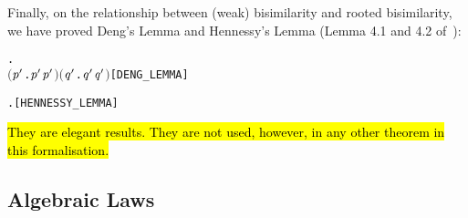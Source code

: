 Finally, on the relationship between (weak) bisimilarity and rooted bisimilarity, 
we have proved Deng's Lemma and Hennessy's Lemma
(Lemma 4.1 and 4.2 of~\citep[p.~176,~178]{Gorrieri:2015jt}):
\begin{alltt}
\HOLTokenTurnstile{} \HOLSymConst{\HOLTokenForall{}} .
        \HOLSymConst{\HOLTokenWeakEQ}  \HOLSymConst{\HOLTokenImp{}}
       \ensuremath{(}\HOLSymConst{\HOLTokenExists{}}\ensuremath{\HOLBoundVar{p}\sp{\prime}}.  \HOLTokenTransBegin\HOLSymConst{\ensuremath{\tau}}\HOLTokenTransEnd \ensuremath{\HOLBoundVar{p}\sp{\prime}} \HOLSymConst{\HOLTokenConj{}} \ensuremath{\HOLBoundVar{p}\sp{\prime}} \HOLSymConst{\HOLTokenWeakEQ} \ensuremath{)} \HOLSymConst{\HOLTokenDisj{}} \ensuremath{(}\HOLSymConst{\HOLTokenExists{}}\ensuremath{\HOLBoundVar{q}\sp{\prime}}.  \HOLTokenTransBegin\HOLSymConst{\ensuremath{\tau}}\HOLTokenTransEnd \ensuremath{\HOLBoundVar{q}\sp{\prime}} \HOLSymConst{\HOLTokenConj{}}  \HOLSymConst{\HOLTokenWeakEQ} \ensuremath{\HOLBoundVar{q}\sp{\prime}}\ensuremath{)} \HOLSymConst{\HOLTokenDisj{}}  \HOLSymConst{\HOLTokenObsCongr} \hfill{[DENG_LEMMA]}
  
\HOLTokenTurnstile{} \HOLSymConst{\HOLTokenForall{}} .  \HOLSymConst{\HOLTokenWeakEQ}  \HOLSymConst{\HOLTokenEquiv{}}  \HOLSymConst{\HOLTokenObsCongr}  \HOLSymConst{\HOLTokenDisj{}}  \HOLSymConst{\HOLTokenObsCongr} \HOLSymConst{\ensuremath{\tau}}\HOLSymConst{\ensuremath{\ldotp}} \HOLSymConst{\HOLTokenDisj{}} \HOLSymConst{\ensuremath{\tau}}\HOLSymConst{\ensuremath{\ldotp}} \HOLSymConst{\HOLTokenObsCongr} \hfill{[HENNESSY_LEMMA]}
\end{alltt}
\hl{They are elegant results. They are not used, however, in any other theorem in this formalisation.}

\subsection{Algebraic Laws}
\label{ss:alaws}

